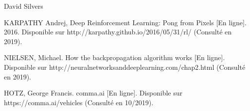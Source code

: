 \documentclass[12pt,a4paper]{extarticle}
\begin{document}
\begin{enumerate}[label = {\bfseries [\arabic*] } ]
\item David Silvers
\item KARPATHY Andrej, Deep Reinforcement Learning: Pong from Pixels [En ligne]. 2016. Disponible sur http://karpathy.github.io/2016/05/31/rl/ (Consulté en 2019).
\item NIELSEN, Michael. How the backpropagation algorithm works [En ligne]. Disponible sur http://neuralnetworksanddeeplearning.com/chap2.html (Consulté en 2019).
\item HOTZ, George Francis. comma.ai [En ligne].
Disponible sur https://comma.ai/vehicles (Consulté en 10/2019).
\end{enumerate}
\end{document}

